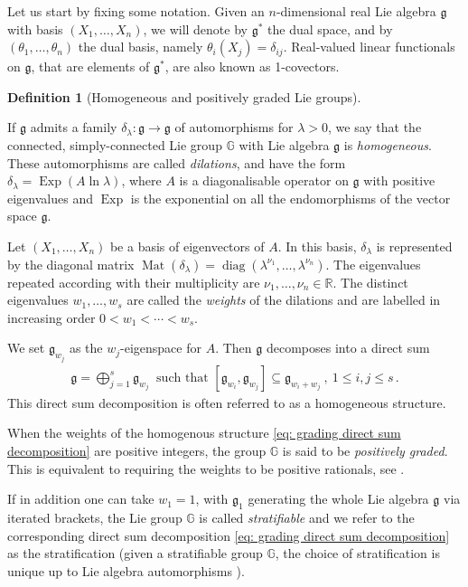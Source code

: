 \documentclass[dvipsnames]{amsart}
\theoremstyle{definition}
\newtheorem{definition}[theorem]{Definition}
\theoremstyle{definition}
\numberwithin{equation}{section}
\newcommand{\R}{\mathbb{R}}
\newcommand{\G}{\mathbb{G}}
\begin{document}
Let us start by fixing some notation. Given an $n$-dimensional real Lie algebra $\mathfrak{g}$ with basis {$(X_1,\ldots,X_n)$}, 
{we will denote by $\mathfrak{g}^\ast$ the dual space, and by $(\theta_1,\ldots,\theta_n)$ the dual basis, namely $\theta_i(X_j)=\delta_{ij}$. 
Real-valued linear functionals on $\mathfrak{g}$, that are elements of $\mathfrak g^\ast$, are also known as 1-covectors.}
\begin{definition}[{Homogeneous and }positively graded Lie groups]\label{def: hom Lie group}
  {If $\mathfrak{g}$ admits a family $\delta_\lambda\colon\mathfrak{g}\to\mathfrak{g}$ of automorphisms for $\lambda>0$, we say that the connected, simply-connected Lie group $\G$ with Lie algebra $\mathfrak{g}$ is \textit{homogeneous}. These automorphisms are called 
  \textit{dilations}, and have the form $\delta_\lambda=\operatorname{Exp}(A\ln\lambda)$, where $A$ is a diagonalisable operator on $\mathfrak{g}$ with positive eigenvalues and $\operatorname{Exp}$ is the exponential on all the endomorphisms of the vector space $\mathfrak{g}$. 

  Let $(X_1,\ldots,X_n)$ be a basis of eigenvectors of $A$. In this basis, $\delta_\lambda$ is represented by the diagonal matrix $\operatorname{Mat}(\delta_\lambda)=\operatorname{diag}(\lambda^{\nu_1},\ldots,\lambda^{\nu_n})$. The eigenvalues repeated according with their multiplicity are $\nu_1,\ldots,\nu_n\in\R$. The distinct eigenvalues $w_1,\ldots,w_s$ are called the \textit{weights} of the dilations and are labelled in increasing order $0<w_1<\cdots<w_s$.} We set $\mathfrak{g}_{w_j}$ as the $w_j$-eigenspace for $A$. Then $\mathfrak{g}$ decomposes into a direct sum
  \begin{align}\label{eq: grading direct sum decomposition}
      \mathfrak{g}=\bigoplus_{j=1}^s\mathfrak{g}_{w_j}\ \text{ such that }[\mathfrak{g}_{w_i},\mathfrak{g}_{w_j}]\subseteq\mathfrak{g}_{w_i+w_j}\ ,\ 1\le i,j\le s\,.
  \end{align}
  This direct sum decomposition is often referred to as a homogeneous structure.

  {When the weights of the homogenous structure \eqref{eq: grading direct sum decomposition} are positive integers, the group $\G$ is said to be \textit{positively graded}. This is equivalent to requiring the weights to be positive rationals, see} \cite[Lemma 3.1.9]{Fischer2016}. 

 
  If in addition one can take $w_1=1$, with $\mathfrak{g}_1$ generating the whole Lie algebra $\mathfrak{g}$ via iterated brackets, the Lie group $\G$ is called \textit{stratifiable} and we refer to the corresponding direct sum decomposition \eqref{eq: grading direct sum decomposition} as {the} stratification (given a stratifiable group $\G$, the choice of stratification is unique up to Lie algebra automorphisms \cite[Proposition 9.2.9]{donne2024metric}). 
  
\end{definition}
\end{document}
